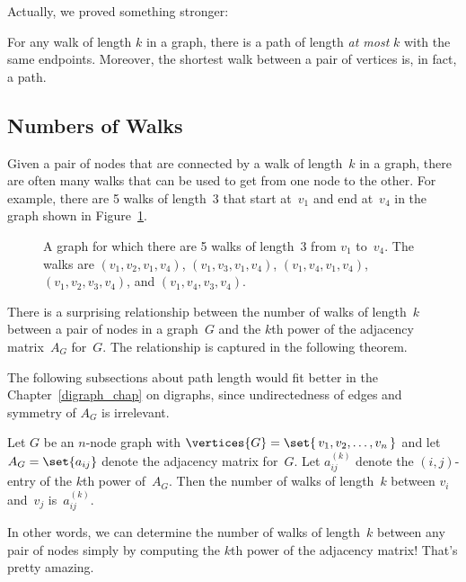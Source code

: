 Actually, we proved something stronger:
\begin{corollary}\label{ss}
For any walk of length $k$ in a graph, there is a path of length
\emph{at most} $k$ with the same endpoints.  Moreover, the shortest
walk between a pair of vertices is, in fact, a path.
\end{corollary}

\subsection{Numbers of Walks}\label{num_walk_subsec}

Given a pair of nodes that are connected by a walk of length~$k$ in a
graph, there are often many walks that can be used to get from one
node to the other.  For example, there are 5 walks of length~3 that
start at~$v_1$ and end at~$v_4$ in the graph shown in
Figure~\ref{fig:5AD}.

\begin{figure}


\caption{A graph for which there are 5 walks of length~3 from $v_1$
  to~$v_4$.  The walks are $(v_1, v_2, v_1, v_4)$, $(v_1, v_3, v_1,
  v_4)$, $(v_1, v_4, v_1, v_4)$, $(v_1, v_2, v_3, v_4)$, and $(v_1,
  v_4, v_3, v_4)$.}
\label{fig:5AD}
\end{figure}

There is a surprising relationship between the number of walks of
length~$k$ between a pair of nodes in a graph~$G$ and the $k$th power
of the adjacency matrix~$A_G$ for~$G$.  The relationship is captured
in the following theorem.
\begin{editingnotes}
   The following subsections about path length would
  fit better in the Chapter~\ref{digraph_chap} on digraphs, since
  undirectedness of edges and symmetry of $A_G$ is irrelevant.
\end{editingnotes}

\begin{theorem}\label{thm:5AE}
Let $G$ be an $n$-node graph with $\vertices{G} = \set{\, v_1, v_2, \dots,
v_n\, }$ and let $A_G = \set{ a_{ij} }$ denote the adjacency matrix
for~$G$.  Let $a_{ij}^{(k)}$ denote the $(i, j)$-entry of the $k$th
power of~$A_G$.  Then the number of walks of length~$k$ between $v_i$
and~$v_j$ is~$a_{ij}^{(k)}$.
\end{theorem}

In other words, we can determine the number of walks of length~$k$
between any pair of nodes simply by computing the $k$th power of the
adjacency matrix!  That's pretty amazing.


